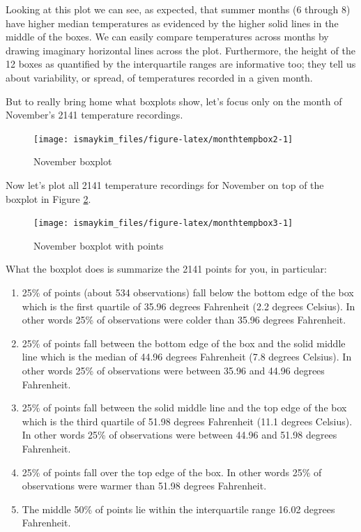 \documentclass[12pt,]{krantz}
\providecommand{\tightlist}{%
  \setlength{\itemsep}{0pt}\setlength{\parskip}{0pt}}
\theoremstyle{definition}
\theoremstyle{definition}
\theoremstyle{definition}
\theoremstyle{remark}
\begin{document}
Looking at this plot we can see, as expected, that summer months (6
through 8) have higher median temperatures as evidenced by the higher
solid lines in the middle of the boxes. We can easily compare
temperatures across months by drawing imaginary horizontal lines across
the plot. Furthermore, the height of the 12 boxes as quantified by the
interquartile ranges are informative too; they tell us about
variability, or spread, of temperatures recorded in a given month.

But to really bring home what boxplots show, let's focus only on the
month of November's 2141 temperature recordings.

\begin{figure}

{\centering \texttt{[image: ismaykim\_files/figure-latex/monthtempbox2-1]} 

}

\caption{November boxplot}\label{fig:monthtempbox2}
\end{figure}

Now let's plot all 2141 temperature recordings for November on top of
the boxplot in Figure \ref{fig:monthtempbox3}.

\begin{figure}

{\centering \texttt{[image: ismaykim\_files/figure-latex/monthtempbox3-1]} 

}

\caption{November boxplot with points}\label{fig:monthtempbox3}
\end{figure}

What the boxplot does is summarize the 2141 points for you, in
particular:

\begin{enumerate}
\def\labelenumi{\arabic{enumi}.}
\tightlist
\item
  25\% of points (about 534 observations) fall below the bottom edge of
  the box which is the first quartile of 35.96 degrees Fahrenheit (2.2
  degrees Celsius). In other words 25\% of observations were colder than
  35.96 degrees Fahrenheit.
\item
  25\% of points fall between the bottom edge of the box and the solid
  middle line which is the median of 44.96 degrees Fahrenheit (7.8
  degrees Celsius). In other words 25\% of observations were between
  35.96 and 44.96 degrees Fahrenheit.
\item
  25\% of points fall between the solid middle line and the top edge of
  the box which is the third quartile of 51.98 degrees Fahrenheit (11.1
  degrees Celsius). In other words 25\% of observations were between
  44.96 and 51.98 degrees Fahrenheit.
\item
  25\% of points fall over the top edge of the box. In other words 25\%
  of observations were warmer than 51.98 degrees Fahrenheit.
\item
  The middle 50\% of points lie within the interquartile range 16.02
  degrees Fahrenheit.
\end{enumerate}
\end{document}
